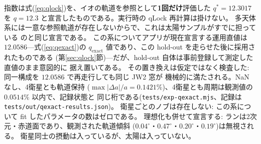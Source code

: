 \documentclass[a4paper,10pt,twocolumn]{ltjsarticle}
\begin{document}
指数は式(\ref{eq:qlock})を、イオの軌道を参照として\textbf{1回だけ}評価した
$q^{*}=12.3017$ を $q=12.3$ と宣言したものである。実行時の qLock 再計算は掛けない。
多天体系には一意な参照軌道が存在しないからで、これは太陽サンプルがすでに担っている
のと同じ宣言である。
この系についてアプリが現在宣言する運用直値は $12.0586$---式(\ref{eq:qexact})の
$q_{\mathrm{exact}}$ 値であり、この hold-out を走らせた後に採用されたものである
(第\ref{sec:qlock}節)---だが、hold-out 自体は事前登録して測定した直値のまま意図的に
据え置いてある。
その置き換えは仮定ではなく検査した: 同一構成を $12.0586$ で再走行しても同じ JW2 窓が
機械的に満たされる。NaN なし、4衛星とも軌道保持
($\max|\Delta a|/a=0.1421\%$)、4衛星とも周期は観測値の $0.0514\%$ 以内で、記録状態と
同じ桁である(\texttt{tests/exp-qexact.mjs}、記録は
\texttt{tests/out/qexact-results.json})。
衛星ごとのノブは存在しない: この系について fit したパラメータの数はゼロである。
理想化も併せて宣言する: ランは2次元・赤道面であり、観測された軌道傾斜
($0.04^{\circ}$・$0.47^{\circ}$・$0.20^{\circ}$・$0.19^{\circ}$)は無視される。
衛星同士の摂動は入っているが、太陽は入っていない。
\end{document}
